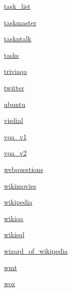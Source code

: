 \begin{DoxyCompactItemize}
\item 
 \hyperlink{namespaceparlai_1_1tasks_1_1task__list}{task\+\_\+list}
\item 
 \hyperlink{namespaceparlai_1_1tasks_1_1taskmaster}{taskmaster}
\item 
 \hyperlink{namespaceparlai_1_1tasks_1_1taskntalk}{taskntalk}
\item 
 \hyperlink{namespaceparlai_1_1tasks_1_1tasks}{tasks}
\item 
 \hyperlink{namespaceparlai_1_1tasks_1_1triviaqa}{triviaqa}
\item 
 \hyperlink{namespaceparlai_1_1tasks_1_1twitter}{twitter}
\item 
 \hyperlink{namespaceparlai_1_1tasks_1_1ubuntu}{ubuntu}
\item 
 \hyperlink{namespaceparlai_1_1tasks_1_1visdial}{visdial}
\item 
 \hyperlink{namespaceparlai_1_1tasks_1_1vqa__v1}{vqa\+\_\+v1}
\item 
 \hyperlink{namespaceparlai_1_1tasks_1_1vqa__v2}{vqa\+\_\+v2}
\item 
 \hyperlink{namespaceparlai_1_1tasks_1_1webquestions}{webquestions}
\item 
 \hyperlink{namespaceparlai_1_1tasks_1_1wikimovies}{wikimovies}
\item 
 \hyperlink{namespaceparlai_1_1tasks_1_1wikipedia}{wikipedia}
\item 
 \hyperlink{namespaceparlai_1_1tasks_1_1wikiqa}{wikiqa}
\item 
 \hyperlink{namespaceparlai_1_1tasks_1_1wikisql}{wikisql}
\item 
 \hyperlink{namespaceparlai_1_1tasks_1_1wizard__of__wikipedia}{wizard\+\_\+of\+\_\+wikipedia}
\item 
 \hyperlink{namespaceparlai_1_1tasks_1_1wmt}{wmt}
\item 
 \hyperlink{namespaceparlai_1_1tasks_1_1woz}{woz}
\end{DoxyCompactItemize}
